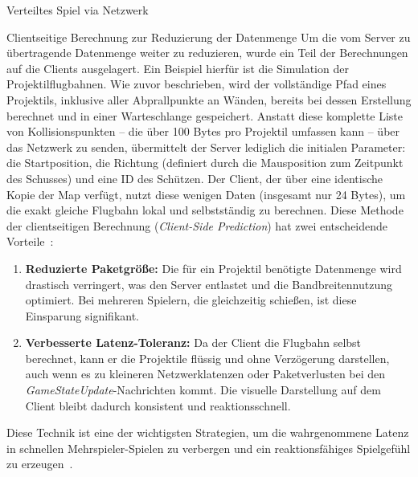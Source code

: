 \begin{section}{Verteiltes Spiel via Netzwerk}
\begin{subsection}{Clientseitige Berechnung zur Reduzierung der Datenmenge}
Um die vom Server zu übertragende Datenmenge weiter zu reduzieren, wurde ein Teil der Berechnungen auf die Clients ausgelagert.
Ein Beispiel hierfür ist die Simulation der Projektilflugbahnen.
Wie zuvor beschrieben, wird der vollständige Pfad eines Projektils, inklusive aller Abprallpunkte an Wänden, bereits bei dessen Erstellung berechnet und in einer Warteschlange gespeichert.
Anstatt diese komplette Liste von Kollisionspunkten – die über 100 Bytes pro Projektil umfassen kann – über das Netzwerk zu senden, übermittelt der Server lediglich die initialen Parameter: die Startposition, die Richtung (definiert durch die Mausposition zum Zeitpunkt des Schusses) und eine ID des Schützen.
Der Client, der über eine identische Kopie der Map verfügt, nutzt diese wenigen Daten (insgesamt nur 24 Bytes), um die exakt gleiche Flugbahn lokal und selbstständig zu berechnen.
Diese Methode der clientseitigen Berechnung (\emph{Client-Side Prediction}) hat zwei entscheidende Vorteile~\cite{valve_prediction}:
\begin{enumerate}
    \item \textbf{Reduzierte Paketgröße:} Die für ein Projektil benötigte Datenmenge wird drastisch verringert, was den Server entlastet und die Bandbreitennutzung optimiert.
Bei mehreren Spielern, die gleichzeitig schießen, ist diese Einsparung signifikant.
\item \textbf{Verbesserte Latenz-Toleranz:} Da der Client die Flugbahn selbst berechnet, kann er die Projektile flüssig und ohne Verzögerung darstellen, auch wenn es zu kleineren Netzwerklatenzen oder Paketverlusten bei den \emph{GameStateUpdate}-Nachrichten kommt.
Die visuelle Darstellung auf dem Client bleibt dadurch konsistent und reaktionsschnell.
\end{enumerate}
Diese Technik ist eine der wichtigsten Strategien, um die wahrgenommene Latenz in schnellen Mehrspieler-Spielen zu verbergen und ein reaktionsfähiges Spielgefühl zu erzeugen~\cite{gambetta2014prediction}.
\end{subsection}

\end{section}